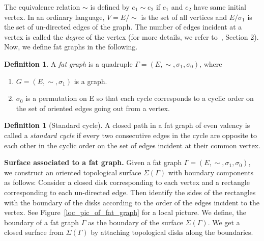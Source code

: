 \documentclass[11pt,reqno]{amsart}
\theoremstyle{plain}
\theoremstyle{definition}
\newtheorem{definition}[theorem]{Definition}
\theoremstyle{remark}
\numberwithin{equation}{section}
\numberwithin{figure}{section}
\begin{document}
The equivalence relation $\sim$ is defined by $e_1\sim e_2$ if $e_1$ and $e_2$ have same initial vertex. In an ordinary language, $V=E/\sim$ is the set of all vertices and $E/\sigma_1$ is the set of un-directed edges of the graph. The number of edges incident at a vertex is called the \textit{degree} of the vertex (for more details, we refer to~\cite{Sanki2018}, Section 2). Now, we define fat graphs in the following.
\begin{definition}
A \textit{fat graph} is a quadruple $\Gamma=(E,\sim,\sigma_1,\sigma_0)$, where
\begin{enumerate}
    \item $G=(E,\sim,\sigma_1)$ is a graph.
    \item $\sigma_0$ is a permutation on E so that each cycle corresponds to a cyclic order on the set of oriented edges going out from a vertex.
\end{enumerate}
\end{definition}

\begin{definition}[Standard cycle]
    A closed path in a fat graph of even valency is called a \textit{standard cycle} if every two consecutive edges in the cycle are opposite to each other in the cyclic order on the set of edges incident at their common vertex.
\end{definition}

\textbf{Surface associated to a fat graph.}
Given a fat graph $\Gamma=(E, \sim, \sigma_1, \sigma_0)$, we construct an oriented topological surface $\Sigma(\Gamma)$ with boundary components as follows: Consider a closed disk corresponding to each vertex and a rectangle corresponding to each un-directed edge. Then identify the sides of the rectangles with the boundary of the disks according to the order of the edges incident to the vertex. See Figure~\ref{loc_pic_of_fat_graph} for a local picture. We define, the boundary of a fat graph $\Gamma$ as the boundary of the surface $\Sigma(\Gamma)$. We get a closed surface from $\Sigma(\Gamma)$ by attaching topological disks along the boundaries.
\end{document}
